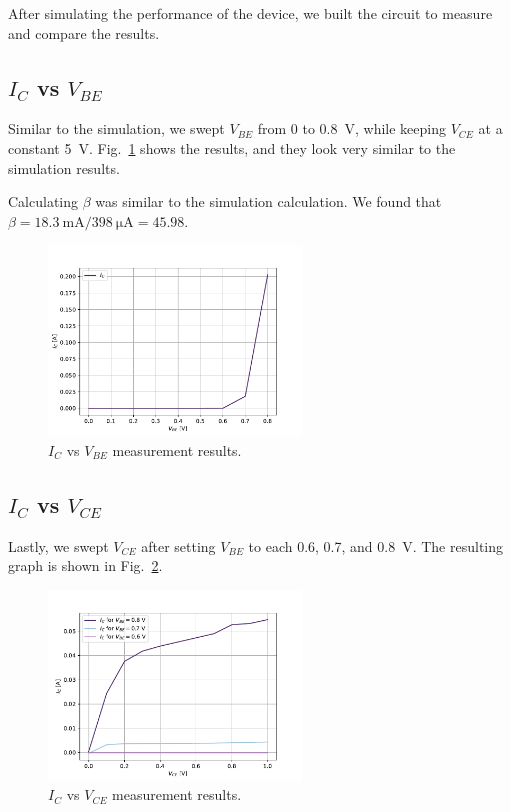\documentclass{../../ece-report}
\begin{document}
After simulating the performance of the device, we built the circuit
to measure and compare the results. 

\subsection*{$I_C$ vs $V_{BE}$}

Similar to the simulation, we swept $V_{BE}$ from 0 to 0.8~V, while keeping
$V_{CE}$ at a constant 5~V. Fig.~\ref{plot:meas_ic_vbe} shows the results,
and they look very similar to the simulation results.

Calculating $\beta$ was similar to the simulation calculation.
We found that $\beta = 18.3~\si{\mA} / 398~\si{\uA} = 45.98$.

\begin{figure}[h!]
  \centering
  \includegraphics[width=0.6\textwidth]{../plots/pdf/meas_sweep_vbe.pdf}
  \caption{$I_C$ vs $V_{BE}$ measurement results.}
  \label{plot:meas_ic_vbe}
\end{figure}

\subsection*{$I_C$ vs $V_{CE}$}

Lastly, we swept $V_{CE}$ after setting $V_{BE}$ to each 0.6, 0.7, and 0.8~V.
The resulting graph is shown in Fig.~\ref{plot:meas_ic_vce}.


\begin{figure}[h!]
  \centering
  \includegraphics[width=0.6\textwidth]{../plots/pdf/meas_sweep_vce.pdf}
  \caption{$I_C$ vs $V_{CE}$ measurement results.}
  \label{plot:meas_ic_vce}
\end{figure}
\end{document}
